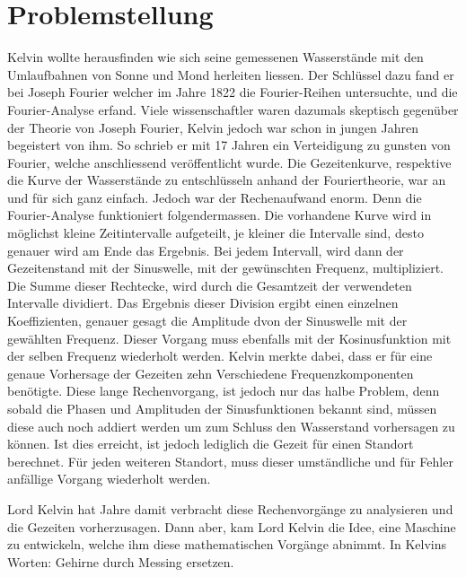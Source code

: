 %
%
%
%
\section{Problemstellung
\label{gezeiten:section:teil1}}
Kelvin wollte herausfinden wie sich seine gemessenen Wasserstände mit den Umlaufbahnen von Sonne und Mond herleiten liessen.
Der Schlüssel dazu fand er bei Joseph Fourier welcher im Jahre 1822 die Fourier-Reihen untersuchte, und die Fourier-Analyse erfand.
Viele wissenschaftler waren dazumals skeptisch gegenüber der Theorie von Joseph Fourier, Kelvin jedoch war schon in jungen Jahren begeistert von ihm.
So schrieb er mit 17 Jahren ein Verteidigung zu gunsten von Fourier, welche anschliessend veröffentlicht wurde.
Die Gezeitenkurve, respektive die Kurve der Wasserstände zu entschlüsseln anhand der Fouriertheorie, war an und für sich ganz einfach.
Jedoch war der Rechenaufwand enorm.
Denn die Fourier-Analyse funktioniert folgendermassen.
Die vorhandene Kurve wird in möglichst kleine Zeitintervalle aufgeteilt, je kleiner die Intervalle sind, desto genauer wird am Ende das Ergebnis.
Bei jedem Intervall, wird dann der Gezeitenstand mit der Sinuswelle, mit der gewünschten Frequenz, multipliziert.
Die Summe dieser Rechtecke, wird durch die Gesamtzeit der verwendeten Intervalle dividiert.
Das Ergebnis dieser Division ergibt einen einzelnen Koeffizienten, genauer gesagt die Amplitude dvon der Sinuswelle mit der gewählten Frequenz.
Dieser Vorgang muss ebenfalls mit der Kosinusfunktion mit der selben Frequenz wiederholt werden.
Kelvin merkte dabei, dass er für eine genaue Vorhersage der Gezeiten zehn Verschiedene Frequenzkomponenten benötigte.
Diese lange Rechenvorgang, ist jedoch nur das halbe Problem, denn sobald die Phasen und Amplituden der Sinusfunktionen bekannt sind, müssen diese auch noch addiert werden um zum Schluss den Wasserstand vorhersagen zu können.
Ist dies erreicht, ist jedoch lediglich die Gezeit für einen Standort berechnet.
Für jeden weiteren Standort, muss dieser umständliche und für Fehler anfällige Vorgang wiederholt werden.

Lord Kelvin hat Jahre damit verbracht diese Rechenvorgänge zu analysieren und die Gezeiten vorherzusagen.
Dann aber, kam Lord Kelvin die Idee, eine Maschine zu entwickeln, welche ihm diese mathematischen Vorgänge abnimmt. In Kelvins Worten: Gehirne durch Messing ersetzen.



